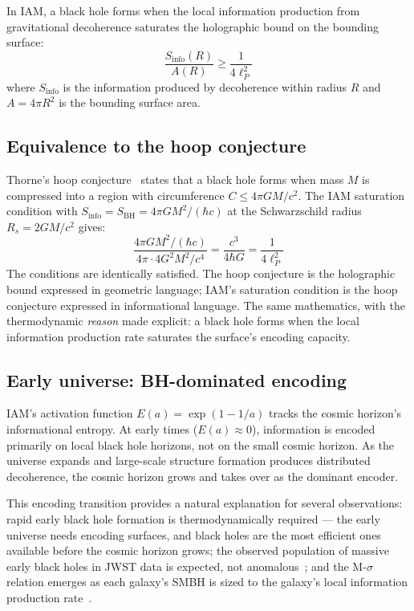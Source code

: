 \documentclass[12pt,a4paper]{article}
\begin{document}
In IAM, a black hole forms when the local information production from gravitational
decoherence saturates the holographic bound on the bounding surface:
\begin{equation}
\frac{S_\mathrm{info}(R)}{A(R)} \geq \frac{1}{4\ell_P^2}
\end{equation}
where $S_\mathrm{info}$ is the information produced by decoherence within radius
$R$ and $A = 4\pi R^2$ is the bounding surface area.

\subsection{Equivalence to the hoop conjecture}

Thorne's hoop conjecture~\citep{Thorne1972} states that a black hole forms when
mass $M$ is compressed into a region with circumference $C \leq 4\pi GM/c^2$.
The IAM saturation condition with $S_\mathrm{info} = S_\mathrm{BH} =
4\pi G M^2/(\hbar c)$ at the Schwarzschild radius $R_s = 2GM/c^2$ gives:
\begin{equation}
\frac{4\pi G M^2/(\hbar c)}{4\pi \cdot 4G^2M^2/c^4}
= \frac{c^3}{4\hbar G}
= \frac{1}{4\ell_P^2}
\end{equation}
The conditions are identically satisfied. The hoop conjecture is the holographic
bound expressed in geometric language; IAM's saturation condition is the hoop
conjecture expressed in informational language. The same mathematics, with the
thermodynamic \emph{reason} made explicit: a black hole forms when the local
information production rate saturates the surface's encoding capacity.

\subsection{Early universe: BH-dominated encoding}

IAM's activation function $E(a) = \exp(1 - 1/a)$ tracks the cosmic horizon's
informational entropy. At early times ($E(a) \approx 0$), information is encoded
primarily on local black hole horizons, not on the small cosmic horizon. As the
universe expands and large-scale structure formation produces distributed
decoherence, the cosmic horizon grows and takes over as the dominant encoder.

This encoding transition provides a natural explanation for several observations:
rapid early black hole formation is thermodynamically required --- the early
universe needs encoding surfaces, and black holes are the most efficient ones
available before the cosmic horizon grows; the observed population of massive
early black holes in JWST data is expected, not anomalous~\citep{Mahaffey2026c};
and the M-$\sigma$ relation emerges as each galaxy's SMBH is sized to the galaxy's
local information production rate~\citep{Mahaffey2026c}.
\end{document}
